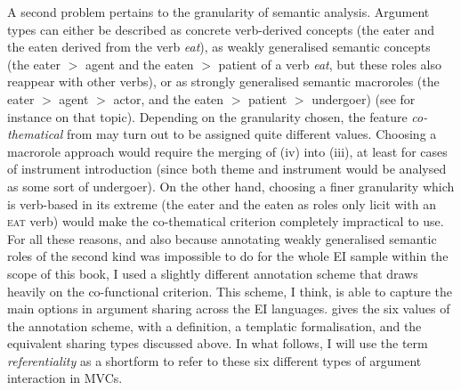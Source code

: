 A second problem pertains to the granularity of semantic analysis. Argument types can either be described as concrete verb-derived concepts (the eater and the eaten derived from the verb \textit{eat}), as weakly generalised semantic concepts (the eater $>$ agent and the eaten $>$ patient of a verb \textit{eat}, but these roles also reappear with other verbs), or as strongly generalised semantic macroroles (the eater $>$ agent $>$ actor, and the eaten $>$ patient $>$ undergoer) (see for instance \citealt{van1997syntax} on that topic). Depending on the granularity chosen, the feature \textit{co-thematical} from  may turn out to be assigned quite different values. Choosing a macrorole approach would require the merging of (iv) into (iii), at least for cases of instrument introduction (since both theme and instrument would be analysed as some sort of undergoer). On the other hand, choosing a finer granularity which is verb-based in its extreme (the eater and the eaten as roles only licit with an \textsc{eat} verb) would make the co-thematical criterion completely impractical to use. For all these reasons, and also because annotating weakly generalised semantic roles of the second kind was impossible to do for the whole EI sample within the scope of this book, I used a slightly different annotation scheme that draws heavily on the co-functional criterion. This scheme, I think, is able to capture the main options in argument sharing across the EI languages.  gives the six values of the annotation scheme, with a definition, a templatic formalisation, and the equivalent sharing types discussed above. In what follows, I will use the term \textit{referentiality} as a shortform to refer to these six different types of argument interaction in MVCs.

